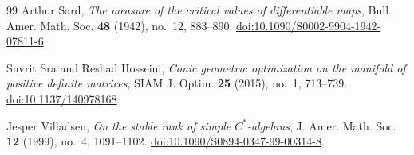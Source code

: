\begin{thebibliography}{99}
Arthur Sard,
\emph{The measure of the critical values of differentiable maps},
Bull. Amer. Math. Soc. \textbf{48} (1942), no.~12, 883--890.
\href{https://doi.org/10.1090/S0002-9904-1942-07811-6}
{doi:10.1090/S0002-9904-1942-07811-6}.

Suvrit Sra and Reshad Hosseini,
\emph{Conic geometric optimization on the manifold of positive definite matrices},
SIAM J. Optim. \textbf{25} (2015), no.~1, 713--739.
\href{https://doi.org/10.1137/140978168}{doi:10.1137/140978168}.

Jesper Villadsen,
\emph{On the stable rank of simple $C^*$-algebras},
J. Amer. Math. Soc. \textbf{12} (1999), no.~4, 1091--1102.
\href{https://doi.org/10.1090/S0894-0347-99-00314-8}
{doi:10.1090/S0894-0347-99-00314-8}.

\end{thebibliography}
